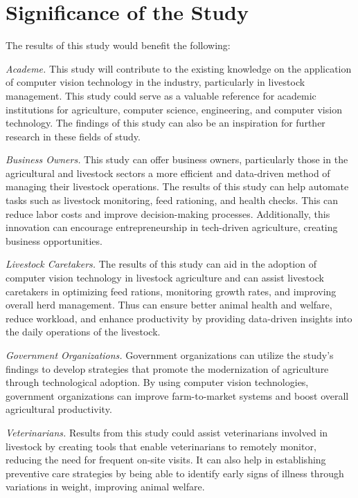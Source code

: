 {\section{Significance of the Study}

The results of this study would benefit the following: 

\textit{Academe.} This study will contribute to the existing knowledge on the application of computer vision technology in the industry, particularly in livestock management. This study could serve as a valuable reference for academic institutions for agriculture, computer science, engineering, and computer vision technology. The findings of this study can also be an inspiration for further research in these fields of study.

\textit{Business Owners.} This study can offer business owners, particularly those in the agricultural and livestock sectors a more efficient and data-driven method of managing their livestock operations. The results of this study can help automate tasks such as livestock monitoring, feed rationing, and health checks. This can reduce labor costs and improve decision-making processes. Additionally, this innovation can encourage entrepreneurship in tech-driven agriculture, creating business opportunities.

\textit{Livestock Caretakers.} The results of this study can aid in the adoption of computer vision technology in livestock agriculture and can assist livestock caretakers in optimizing feed rations, monitoring growth rates, and improving overall herd management. Thus can ensure better animal health and welfare, reduce workload, and enhance productivity by providing data-driven insights into the daily operations of the livestock.

\textit{Government Organizations.} Government organizations can utilize the study’s findings to develop strategies that promote the modernization of agriculture through technological adoption. By using computer vision technologies, government organizations can improve farm-to-market systems and boost overall agricultural productivity.

\textit{Veterinarians.} Results from this study could assist veterinarians involved in livestock by creating tools that enable veterinarians to remotely monitor, reducing the need for frequent on-site visits. It can also help in establishing preventive care strategies by being able to identify early signs of illness through variations in weight, improving animal welfare.

}
